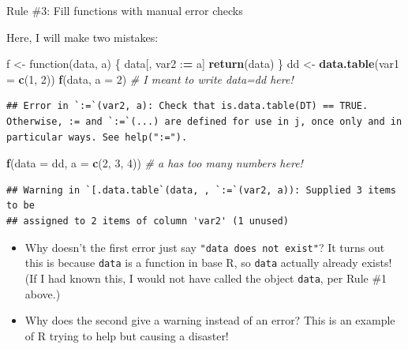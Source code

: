 \documentclass[10pt,ignorenonframetext,]{beamer}
\newenvironment{Shaded}{\begin{snugshade}}{\end{snugshade}}
\newcommand{\KeywordTok}[1]{\textcolor[rgb]{0.13,0.29,0.53}{\textbf{{#1}}}}
\newcommand{\DataTypeTok}[1]{\textcolor[rgb]{0.13,0.29,0.53}{{#1}}}
\newcommand{\DecValTok}[1]{\textcolor[rgb]{0.00,0.00,0.81}{{#1}}}
\newcommand{\StringTok}[1]{\textcolor[rgb]{0.31,0.60,0.02}{{#1}}}
\newcommand{\CommentTok}[1]{\textcolor[rgb]{0.56,0.35,0.01}{\textit{{#1}}}}
\newcommand{\ErrorTok}[1]{\textcolor[rgb]{0.64,0.00,0.00}{\textbf{{#1}}}}
\newcommand{\NormalTok}[1]{{#1}}
\providecommand{\tightlist}{%
\setlength{\itemsep}{0pt}\setlength{\parskip}{0pt}}
\begin{document}
\begin{frame}[fragile]{Rule \#3: Fill functions with manual error
checks}

Here, I will make two mistakes:

\footnotesize

\begin{Shaded}
\begin{Highlighting}[]
\NormalTok{f <-}\StringTok{ }\NormalTok{function(data, a) \{}
  \NormalTok{data[, var2 :}\ErrorTok{=}\StringTok{ }\NormalTok{a]}
  \KeywordTok{return}\NormalTok{(data)}
\NormalTok{\}}
\NormalTok{dd <-}\StringTok{ }\KeywordTok{data.table}\NormalTok{(}\DataTypeTok{var1 =} \KeywordTok{c}\NormalTok{(}\DecValTok{1}\NormalTok{, }\DecValTok{2}\NormalTok{))}
\KeywordTok{f}\NormalTok{(data, }\DataTypeTok{a =} \DecValTok{2}\NormalTok{) }\CommentTok{# I meant to write data=dd here!}
\end{Highlighting}
\end{Shaded}

\begin{verbatim}
## Error in `:=`(var2, a): Check that is.data.table(DT) == TRUE. Otherwise, := and `:=`(...) are defined for use in j, once only and in particular ways. See help(":=").
\end{verbatim}

\begin{Shaded}
\begin{Highlighting}[]
\KeywordTok{f}\NormalTok{(}\DataTypeTok{data =} \NormalTok{dd, }\DataTypeTok{a =} \KeywordTok{c}\NormalTok{(}\DecValTok{2}\NormalTok{, }\DecValTok{3}\NormalTok{, }\DecValTok{4}\NormalTok{)) }\CommentTok{# a has too many numbers here!}
\end{Highlighting}
\end{Shaded}

\begin{verbatim}
## Warning in `[.data.table`(data, , `:=`(var2, a)): Supplied 3 items to be
## assigned to 2 items of column 'var2' (1 unused)
\end{verbatim}

\normalsize

\begin{itemize}
\tightlist
\item
  Why doesn't the first error just say
  \texttt{"data\ does\ not\ exist"}? It turns out this is because
  \texttt{data} is a function in base R, so \texttt{data} actually
  already exists! (If I had known this, I would not have called the
  object \texttt{data}, per Rule \#1 above.)
\item
  Why does the second give a warning instead of an error? This is an
  example of R trying to help but causing a disaster!
\end{itemize}

\end{frame}
\end{document}
